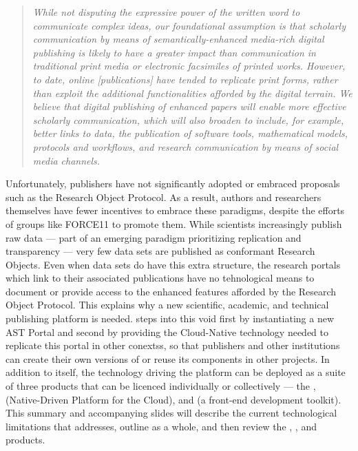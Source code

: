 \documentclass[10pt,letterpaper]{article}
\begin{document}
\begin{quote}
{\textit{While not disputing the expressive power of the written 
word to communicate complex ideas, our foundational assumption 
is that scholarly communication by means of semantically-enhanced 
media-rich digital publishing is likely to have a greater impact 
than communication in traditional print media or electronic 
facsimiles of printed works.  However, to date, online [publications] 
have tended to replicate print forms, rather than exploit the 
additional functionalities afforded by the digital terrain.  
We believe that digital publishing of enhanced papers will enable 
more effective scholarly communication, which will also broaden 
to include, for example, better links to data, the publication of 
software tools, mathematical models, protocols and workflows, and 
research communication by means of social media channels.}}
\end{quote}
\qvspace{}
\p{}
Unfortunately, publishers have not significantly adopted 
or embraced proposals such as the Research Object Protocol.  
As a result, authors and researchers themselves have 
fewer incentives to embrace these paradigms, 
despite the efforts of groups like FORCE11 to promote them.  
While scientists increasingly publish raw data --- part of 
an emerging paradigm prioritizing replication 
and transparency --- very few data sets are published 
as conformant Research Objects.  
Even when data sets do have this 
extra structure, the research portals which 
link to their associated publications have 
no tehnological means to document 
or provide access to the enhanced features 
afforded by the Research Object Protocol.
\p{}
This explains why a new scientific, academic, and technical 
publishing platform is needed.  {\MOSAIC} 
steps into this void first by instantiating a new 
AST Portal and second by providing the Cloud-Native 
technology needed to replicate this portal in 
other conextss, so that publishers and 
other institutions can create their own versions of 
{\MOSAIC} or reuse its components in other projects.
\p{}
In addition to {\MOSAIC} itself, 
the technology driving the platform can be 
deployed as a suite of three products that can 
be licenced individually or collectively --- the
{\MOSAIC} {\SDK}, {\NDPCloud} (Native-Driven Platform 
for the Cloud), and {\VersatileUX} (a front-end 
development toolkit).  
\p{}
This summary and accompanying slides will describe the 
current technological limitations that {\MOSAIC} 
addresses, outline {\MOSAIC} as a whole, 
and then review the {\MOSAIC} {\SDK}, {\NDPCloud}, 
and {\VersatileUX} products.
\p{}
\end{document}
